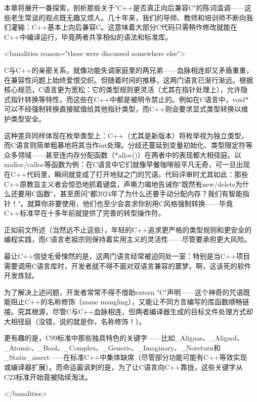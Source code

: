 
本章将展开一番探索，剖析那些关于"C++是否真正向后兼容C"的陈词滥调——这些老生常谈的观点既无趣又烦人。几十年来，我们的导师、教师和培训师不断向我们灌输：C++基本上向后兼容C。这意味着大部分C代码只需稍作修改就能在C++中编译运行，毕竟两者共享相似的语法和标准库。

\begin{shell}
<banalities reason="these were discussed somewhere else">
\end{shell}

C与C++的亲密关系，就像功能失调家庭里的两兄弟——血脉相连却又矛盾重重，在兼容性问题上始终爱恨交织。但随着时间的推移，这两门语言已渐行渐远。根据核心规范，C语言更为宽松：它的类型规则更灵活（尤其在指针处理上），允许隐式指针转换等特性，而这些在C++中都是被明令禁止的。例如在C语言中，void*可以不经强制转换直接赋值给其他指针类型，而C++则会要求显式类型转换以维护类型安全。

这种差异同样体现在枚举类型上：C++（尤其是新版本）将枚举视为独立类型，而C语言则简单粗暴地将其当作int处理。分歧还蔓延到变量初始化、类型限定符等众多领域——甚至连内存分配函数（*alloc()）在两者中的表现都大相径庭。以malloc/calloc等函数为例：在C语言中它们就像早餐咖啡般平凡无奇，可一旦出现在C++代码里，瞬间就变成了打开地狱之门的咒语。代码评审时尤其如此：那些C++原教旨主义者会惊恐地抓着键盘，声嘶力竭地告诫你"既然有new/delete为什么还要用C函数"，甚至质问"都2024年了为什么还要手动分配内存？我们有智能指针！"。就算你非要使用，他们也至少会哀求你别用C风格强制转换——毕竟C++标准早在十多年前就提供了完善的转型操作符。

正如前文所述（当然远不止这些），年轻的C++追求更严格的类型规则和更安全的编程实践，而C语言老祖宗则保持着实用主义的灵活性——尽管要承担更大风险。

最让C++信徒毛骨悚然的是，这两门语言经常被迫同处一室：特别是当C++项目需要调用C语言库时，开发者就不得不面对双语言兼容的噩梦。啊，这该死的软件开发炼狱。

为了解决上述问题，开发者常常不得不借助extern "C"声明——这个神奇的咒语既能阻止C++的名称修饰（name mangling），又能让不同方言编写的库函数顺畅链接。究其根源，尽管C与C++血脉相连，但两者编译器生成的目标文件处理方式却大相径庭（没错，说的就是你，名称修饰！）。

更有趣的是，C99标准中那些独具特色的关键字——比如\_Alignas、\_Alignof、\_Atomic、\_Bool、\_Complex、\_Generic、\_Imaginary、\_Noreturn和\_Static\_assert——在标准C++中集体缺席（尽管部分功能可能有C++等效实现或编译器扩展）。而命运最讽刺的是，为了让C语言向C++靠拢，这些关键字从C23标准开始竟被陆续淘汰。

\begin{shell}
</banalities>
\end{shell}

